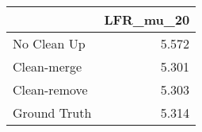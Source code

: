 \begin{tabular}{lr}
\toprule
{} & LFR_mu_20 \\
\midrule
No Clean Up  &     5.572 \\
Clean-merge  &     5.301 \\
Clean-remove &     5.303 \\
Ground Truth &     5.314 \\
\bottomrule
\end{tabular}
